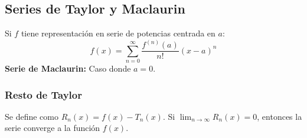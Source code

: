 \documentclass[a4paper,12pt]{article}
\begin{document}
\subsection{Series de Taylor y Maclaurin}
Si $f$ tiene representación en serie de potencias centrada en $a$:
$$ f(x) = \sum_{n=0}^{\infty} \frac{f^{(n)}(a)}{n!} (x-a)^n $$
\textbf{Serie de Maclaurin:} Caso donde $a = 0$.

\subsubsection{Resto de Taylor}
Se define como $R_n(x) = f(x) - T_n(x)$. Si $\lim_{n \to \infty} R_n(x) = 0$, entonces la serie converge a la función $f(x)$.
\end{document}
